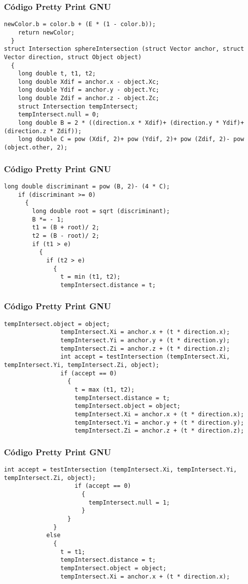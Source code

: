 \documentclass{beamer}
\begin{document}
\begin{frame}[fragile]
\frametitle{C\'odigo Pretty Print GNU}
\begin{lstlisting}[style=CStyle]
    newColor.b = color.b + (E * (1 - color.b));
    return newColor;
  }
struct Intersection sphereIntersection (struct Vector anchor, struct Vector direction, struct Object object)
  {
    long double t, t1, t2;
    long double Xdif = anchor.x - object.Xc;
    long double Ydif = anchor.y - object.Yc;
    long double Zdif = anchor.z - object.Zc;
    struct Intersection tempIntersect;
    tempIntersect.null = 0;
    long double B = 2 * ((direction.x * Xdif)+ (direction.y * Ydif)+ (direction.z * Zdif));
    long double C = pow (Xdif, 2)+ pow (Ydif, 2)+ pow (Zdif, 2)- pow (object.other, 2);
\end{lstlisting}
\end{frame}
\begin{frame}[fragile]
\frametitle{C\'odigo Pretty Print GNU}
\begin{lstlisting}[style=CStyle]
    long double discriminant = pow (B, 2)- (4 * C);
    if (discriminant >= 0)
      {
        long double root = sqrt (discriminant);
        B *= - 1;
        t1 = (B + root)/ 2;
        t2 = (B - root)/ 2;
        if (t1 > e)
          {
            if (t2 > e)
              {
                t = min (t1, t2);
                tempIntersect.distance = t;
\end{lstlisting}
\end{frame}
\begin{frame}[fragile]
\frametitle{C\'odigo Pretty Print GNU}
\begin{lstlisting}[style=CStyle]
                tempIntersect.object = object;
                tempIntersect.Xi = anchor.x + (t * direction.x);
                tempIntersect.Yi = anchor.y + (t * direction.y);
                tempIntersect.Zi = anchor.z + (t * direction.z);
                int accept = testIntersection (tempIntersect.Xi, tempIntersect.Yi, tempIntersect.Zi, object);
                if (accept == 0)
                  {
                    t = max (t1, t2);
                    tempIntersect.distance = t;
                    tempIntersect.object = object;
                    tempIntersect.Xi = anchor.x + (t * direction.x);
                    tempIntersect.Yi = anchor.y + (t * direction.y);
                    tempIntersect.Zi = anchor.z + (t * direction.z);
\end{lstlisting}
\end{frame}
\begin{frame}[fragile]
\frametitle{C\'odigo Pretty Print GNU}
\begin{lstlisting}[style=CStyle]
                    int accept = testIntersection (tempIntersect.Xi, tempIntersect.Yi, tempIntersect.Zi, object);
                    if (accept == 0)
                      {
                        tempIntersect.null = 1;
                      }
                  }
              }
            else
              {
                t = t1;
                tempIntersect.distance = t;
                tempIntersect.object = object;
                tempIntersect.Xi = anchor.x + (t * direction.x);
\end{lstlisting}
\end{frame}
\end{document}
